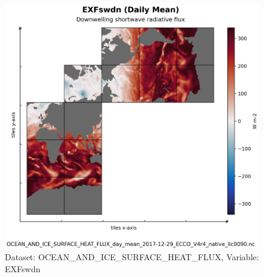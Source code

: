 \begin{figure}[H]
\centering
\includegraphics[scale=0.55]{../images/plots/native_plots/Ocean_and_Sea-Ice_Surface_Heat_Fluxes/EXFswdn.png}
\caption{Dataset: OCEAN\_AND\_ICE\_SURFACE\_HEAT\_FLUX, Variable: EXFswdn}
\label{tab:table-OCEAN_AND_ICE_SURFACE_HEAT_FLUX_EXFswdn-Plot}
\end{figure}
\pagebreak
